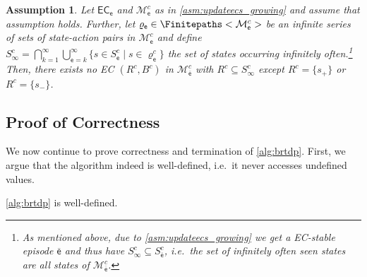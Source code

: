 \documentclass{theoretics}
\newcommand{\UnionSym}{\bigcup}
\newcommand{\IntersectionSym}{\bigcap}
\newcommand{\Union}{\UnionSym}
\newcommand{\Intersection}{\IntersectionSym}
\newcommand{\MDP}{\mathcal{M}}
\newcommand{\States}{S}
\newcommand{\finitepath}{\varrho}
\newcommand{\targetstate}{s_+}
\newcommand{\sinkstate}{s_-}
\newcommand{\algoepisode}{\mathsf{e}}
\newcommand{\algoecs}{\mathsf{EC}}
\newtheorem{assumption}{Assumption}
\begin{document}
\begin{assumption} \label{asm:updateecs_all_visited}
	Let $\algoecs_\algoepisode$ and $\MDP^c_\algoepisode$ as in \cref{asm:updateecs_growing} and assume that assumption holds.
	Further, let $\finitepath_\algoepisode \in \Finitepaths<\MDP^c_\algoepisode>$ be an infinite series of sets of state-action pairs in $\MDP^c_\algoepisode$ and define $\States^c_\infty = \Intersection_{k=1}^\infty \Union_{\algoepisode=k}^\infty \{s \in \States^c_\algoepisode \mid s \in \finitepath^c_\algoepisode\}$ the set of states occurring infinitely often.\footnote{As mentioned above, due to \cref{asm:updateecs_growing} we get a EC-stable episode $\overline{\algoepisode}$ and thus have $\States^c_\infty \subseteq \States_{\overline{\algoepisode}}^c$, i.e.\ the set of infinitely often seen states are all states of $\MDP_{\overline{\algoepisode}}^c$.}
	Then, there exists no EC $(R^c, B^c)$ in $\MDP^c_{\overline{\algoepisode}}$ with $R^c \subseteq \States_\infty^c$ except $R^c = \{\targetstate\}$ or $R^c = \{\sinkstate\}$.
\end{assumption}

\subsection{Proof of Correctness}

We now continue to prove correctness and termination of \cref{alg:brtdp}.
First, we argue that the algorithm indeed is well-defined, i.e.\ it never accesses undefined values.

\begin{lemma}
	\cref{alg:brtdp} is well-defined.
\end{lemma}
\end{document}
